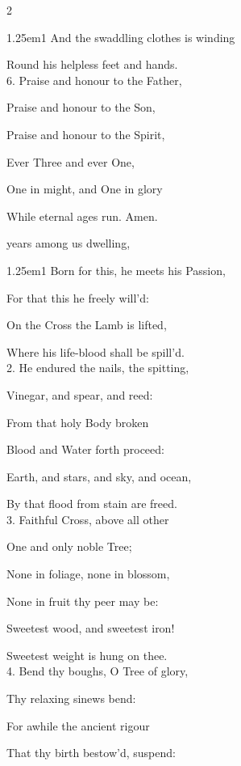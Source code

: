 \begin{paracol}{2}
\begin{hangparas}{1.25em}{1}
And the swaddling clothes is winding

Round his helpless feet and hands.\\

6. Praise and honour to the Father,

Praise and honour to the Son,

Praise and honour to the Spirit,

Ever Three and ever One,

One in might, and One in glory

While eternal ages run. Amen.
\end{hangparas}

\switchcolumn

\mattinsOfficeHymn

 years among us dwelling,

\begin{hangparas}{1.25em}{1}
Born for this, he meets his Passion,

For that this he freely will'd:

On the Cross the Lamb is lifted,

Where his life-blood shall be spill'd.\\

2. He endured the nails, the spitting,

Vinegar, and spear, and reed:

From that holy Body broken

Blood and Water forth proceed:

Earth, and stars, and sky, and ocean,

By that flood from stain are freed.\\

3. Faithful Cross, above all other

One and only noble Tree;

None in foliage, none in blossom,

None in fruit thy peer may be:

Sweetest wood, and sweetest iron!

Sweetest weight is hung on thee.\\

4. Bend thy boughs, O Tree of glory,

Thy relaxing sinews bend:

For awhile the ancient rigour

That thy birth bestow'd, suspend:


\end{hangparas}
\end{paracol}
